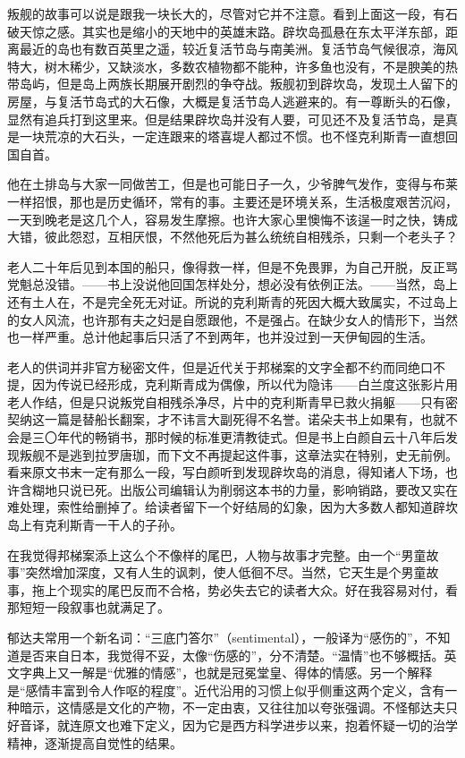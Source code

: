 \par 叛舰的故事可以说是跟我一块长大的，尽管对它并不注意。看到上面这一段，有石破天惊之感。其实也是缩小的天地中的英雄末路。辟坎岛孤悬在东太平洋东部，距离最近的岛也有数百英里之遥，较近复活节岛与南美洲。复活节岛气候很凉，海风特大，树木稀少，又缺淡水，多数农植物都不能种，许多鱼也没有，不是腴美的热带岛屿，但是岛上两族长期展开剧烈的争夺战。叛舰初到辟坎岛，发现土人留下的房屋，与复活节岛式的大石像，大概是复活节岛人逃避来的。有一尊断头的石像，显然有追兵打到这里来。但是结果辟坎岛并没有人要，可见还不及复活节岛，是真是一块荒凉的大石头，一定连跟来的塔喜堤人都过不惯。也不怪克利斯青一直想回国自首。
\par 他在土排岛与大家一同做苦工，但是也可能日子一久，少爷脾气发作，变得与布莱一样招恨，那也是历史循环，常有的事。主要还是环境关系，生活极度艰苦沉闷，一天到晚老是这几个人，容易发生摩擦。也许大家心里懊悔不该逞一时之快，铸成大错，彼此怨怼，互相厌恨，不然他死后为甚么统统自相残杀，只剩一个老头子？
\par 老人二十年后见到本国的船只，像得救一样，但是不免畏罪，为自己开脱，反正骂党魁总没错。——书上没说他回国怎样处分，想必没有依例正法。——当然，岛上还有土人在，不是完全死无对证。所说的克利斯青的死因大概大致属实，不过岛上的女人风流，也许那有夫之妇是自愿跟他，不是强占。在缺少女人的情形下，当然也一样严重。总计他起事后只活了不到两年，也并没过到一天伊甸园的生活。
\par 老人的供词并非官方秘密文件，但是近代关于邦梯案的文字全都不约而同绝口不提，因为传说已经形成，克利斯青成为偶像，所以代为隐讳——白兰度这张影片用老人作结，但是只说叛党自相残杀净尽，片中的克利斯青早已救火捐躯——只有密契纳这一篇是替船长翻案，才不讳言大副死得不名誉。诺朵夫书上如果有，也就不会是三〇年代的畅销书，那时候的标准更清教徒式。但是书上白颜自云十八年后发现叛舰不是逃到拉罗唐珈，而下文不再提起这件事，这章法实在特别，史无前例。看来原文书末一定有那么一段，写白颜听到发现辟坎岛的消息，得知诸人下场，也许含糊地只说已死。出版公司编辑认为削弱这本书的力量，影响销路，要改又实在难处理，索性给删掉了。给读者留下一个好结局的幻象，因为大多数人都知道辟坎岛上有克利斯青一干人的子孙。
\par 在我觉得邦梯案添上这么个不像样的尾巴，人物与故事才完整。由一个“男童故事”突然增加深度，又有人生的讽刺，使人低徊不尽。当然，它天生是个男童故事，拖上个现实的尾巴反而不合格，势必失去它的读者大众。好在我容易对付，看那短短一段叙事也就满足了。
\par 郁达夫常用一个新名词：“三底门答尔”（sentimental），一般译为“感伤的”，不知道是否来自日本，我觉得不妥，太像“伤感的”，分不清楚。“温情”也不够概括。英文字典上又一解是“优雅的情感”，也就是冠冕堂皇、得体的情感。另一个解释是“感情丰富到令人作呕的程度”。近代沿用的习惯上似乎侧重这两个定义，含有一种暗示，这情感是文化的产物，不一定由衷，又往往加以夸张强调。不怪郁达夫只好音译，就连原文也难下定义，因为它是西方科学进步以来，抱着怀疑一切的治学精神，逐渐提高自觉性的结果。
